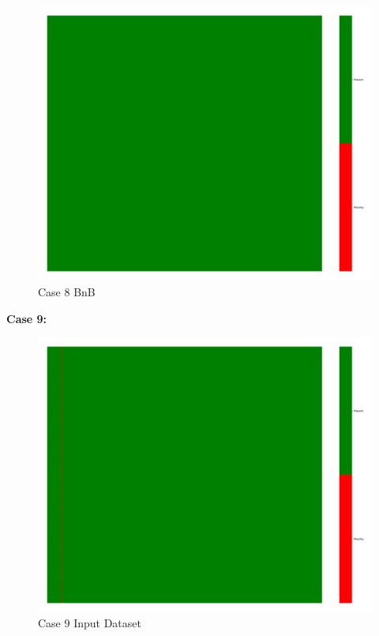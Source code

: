\documentclass[a4paper,12pt]{article}
\begin{document}
\begin{figure}[H]
    \includegraphics[width=\linewidth]{case9_bnb_heatmap_cleaned.png}
    \caption*{Case 8 BnB}
\end{figure}

\textbf{Case 9:}
\begin{figure}[H]
    \centering
    \includegraphics[width=\linewidth]{case10_heatmap_erased.png}
    \caption*{Case 9 Input Dataset}
\end{figure}
\end{document}
